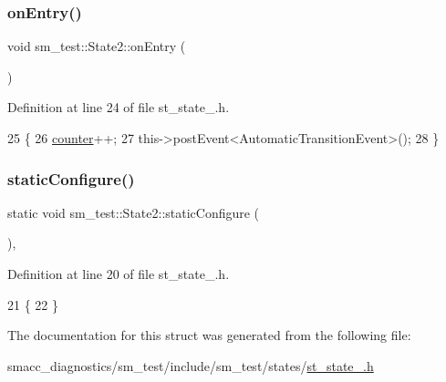 \subsubsection{\texorpdfstring{on\+Entry()}{onEntry()}}
{\footnotesize\ttfamily void sm\+\_\+test\+::\+State2\+::on\+Entry (\begin{DoxyParamCaption}{ }\end{DoxyParamCaption})\hspace{0.3cm}{\ttfamily [inline]}}



Definition at line 24 of file st\+\_\+state\+\_.\+h.


\begin{DoxyCode}
25     \{
26         \hyperlink{namespacesm__test_a1cae0029e5a72ff5017da7e71b3e4a00}{counter}++;
27         this->postEvent<AutomaticTransitionEvent>();
28     \}
\end{DoxyCode}
\mbox{\label{structsm__test_1_1State2_ae346e36b141b813f7975293ce9dceb03}} 
\subsubsection{\texorpdfstring{static\+Configure()}{staticConfigure()}}
{\footnotesize\ttfamily static void sm\+\_\+test\+::\+State2\+::static\+Configure (\begin{DoxyParamCaption}{ }\end{DoxyParamCaption})\hspace{0.3cm}{\ttfamily [inline]}, {\ttfamily [static]}}



Definition at line 20 of file st\+\_\+state\+\_.\+h.


\begin{DoxyCode}
21     \{
22     \}
\end{DoxyCode}


The documentation for this struct was generated from the following file\+:\begin{DoxyCompactItemize}
\item 
smacc\+\_\+diagnostics/sm\+\_\+test/include/sm\+\_\+test/states/\hyperlink{smacc__diagnostics_2sm__test_2include_2sm__test_2states_2st__state__2_8h}{st\+\_\+state\+\_.\+h}\end{DoxyCompactItemize}
